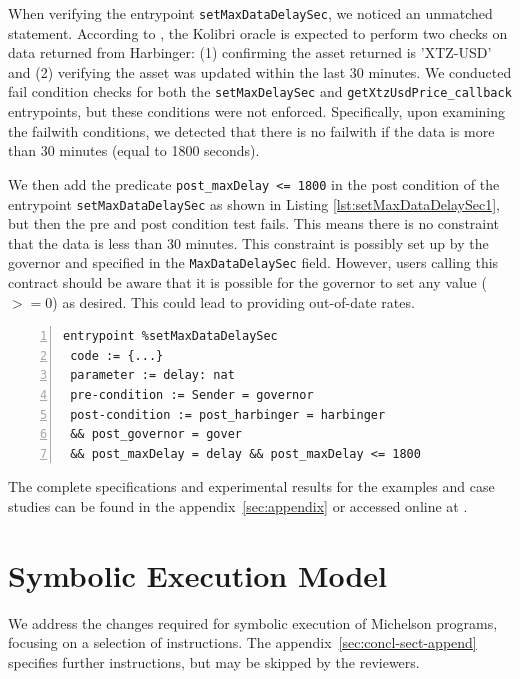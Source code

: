 \documentclass[runningheads]{llncs}
\begin{document}
When verifying the entrypoint \lstinline/setMaxDataDelaySec/, we noticed an unmatched statement. According to \cite{kolibri}, the Kolibri oracle is expected to perform two checks on data returned from Harbinger: (1) confirming the asset returned is 'XTZ-USD' and (2) verifying the asset was updated within the last 30 minutes. We conducted fail condition checks for both the \lstinline/setMaxDelaySec/ and \lstinline/getXtzUsdPrice_callback/ entrypoints, but these conditions were not enforced. Specifically, upon examining the failwith conditions, we detected that there is no failwith if the data is more than 30 minutes (equal to 1800 seconds). 

We then add the predicate \lstinline/post_maxDelay <= 1800/ in the post condition of the entrypoint \lstinline/setMaxDataDelaySec/ as shown in Listing \ref{lst:setMaxDataDelaySec1}, but then the pre and post condition test fails. This means there is no constraint that the data is less than 30 minutes. This constraint is possibly set up by the governor and specified in the \lstinline/MaxDataDelaySec/ field. However, users calling this contract should be aware that it is possible for the governor to set any value ($>=0$) as desired. This could lead to providing out-of-date rates.

\begin{lstlisting}[float=tp,captionpos=b,caption={The specification of the \lstinline/setMaxDataDelaySec/ entrypoint},label={lst:setMaxDataDelaySec1},numbers=left]
entrypoint %setMaxDataDelaySec
 code := {...}
 parameter := delay: nat
 pre-condition := Sender = governor            
 post-condition := post_harbinger = harbinger 
 && post_governor = gover
 && post_maxDelay = delay && post_maxDelay <= 1800
\end{lstlisting}

The complete specifications and experimental results for the examples and case studies can be found in the appendix~\ref{sec:appendix} or accessed online at \cite{scv}.
\section{Symbolic Execution Model}
\label{sec:symbolic-execution-model} 
We address the changes required for symbolic execution of Michelson programs, focusing on a selection of instructions. The
appendix~\ref{sec:concl-sect-append} specifies further instructions,
but may be skipped by the reviewers.
\end{document}

